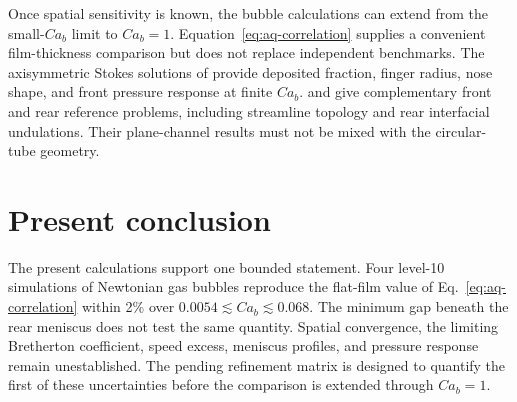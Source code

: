 \documentclass[11pt,a4paper]{article}
\begin{document}
Once spatial sensitivity is known, the bubble calculations can extend from
the small-$Ca_b$ limit to $Ca_b=1$. Equation~\eqref{eq:aq-correlation} supplies
a convenient film-thickness comparison but does not replace independent
benchmarks. The axisymmetric Stokes solutions of
\citet{reinelt1985penetration} provide deposited fraction, finger radius, nose
shape, and front pressure response at finite $Ca_b$.
\citet{giavedoni1997axisymmetric} and \citet{giavedoni1999rear} give
complementary front and rear reference problems, including streamline
topology and rear interfacial undulations. Their plane-channel results must not
be mixed with the circular-tube geometry.

\section{Present conclusion}

The present calculations support one bounded statement. Four level-10
simulations of Newtonian gas bubbles reproduce the flat-film value of
Eq.~\eqref{eq:aq-correlation} within 2\% over
$0.0054\lesssim Ca_b\lesssim0.068$. The minimum gap beneath the rear meniscus
does not test the same quantity. Spatial convergence, the limiting Bretherton
coefficient, speed excess, meniscus profiles, and pressure response remain
unestablished. The pending refinement matrix is designed to quantify the first
of these uncertainties before the comparison is extended through $Ca_b=1$.



\end{document}
